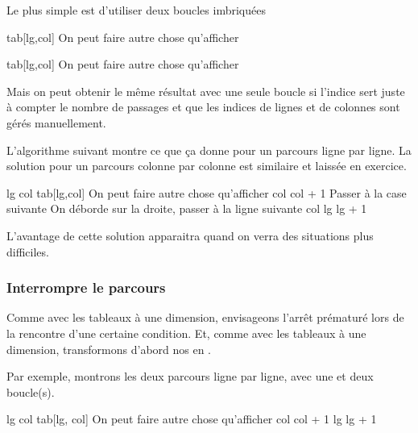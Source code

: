 Le plus simple est d'utiliser deux boucles imbriquées 

\begin{Pseudocode}
			\Write tab[lg,col] \RComment On peut faire autre chose qu'afficher
		\EndFor
	\EndFor
\end{Pseudocode}

\begin{Pseudocode}
			\Write tab[lg,col] \RComment On peut faire autre chose qu'afficher
		\EndFor
	\EndFor
\end{Pseudocode}

Mais on peut obtenir le même résultat avec une seule boucle
si l'indice sert juste à compter le nombre de passages
et que les indices de lignes et de colonnes sont gérés manuellement.

L'algorithme suivant montre ce que ça donne
pour un parcours ligne par ligne.
La solution pour un parcours colonne par colonne est similaire
et laissée en exercice.

\begin{Pseudocode}
	\Let lg 
	\Let col 
		\Write tab[lg,col] \RComment On peut faire autre chose qu'afficher
		\Let col \Gets col + 1	\RComment Passer à la case suivante
		 \RComment On déborde sur la droite, passer à la ligne suivante
			\Let col 
			\Let lg \Gets lg + 1
		\EndIf
	\EndFor
\end{Pseudocode}

L'avantage de cette solution apparaitra 
quand on verra des situations plus difficiles.

\subsubsection*{Interrompre le parcours}

Comme avec les tableaux à une dimension, 
envisageons l'arrêt prématuré lors de la rencontre d'une certaine condition.
Et, comme avec les tableaux à une dimension, 
transformons d'abord nos  en .

Par exemple, montrons les deux parcours ligne par ligne, avec une et deux boucle(s).

\begin{Pseudocode}
	\Let lg 
		\Let col 
			\Write tab[lg, col] \RComment On peut faire autre chose qu'afficher
			\Let col \Gets col + 1
		\EndWhile
		\Let lg \Gets lg + 1
	\EndWhile
\end{Pseudocode}

